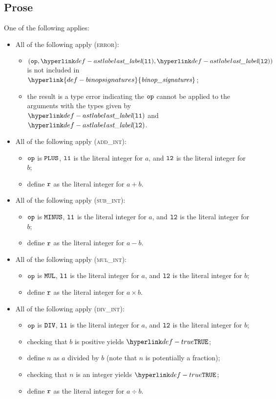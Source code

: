 \documentclass{book}
\newcommand\ProseOrTypeError[0]{\ProseTerminateAs{\TypeErrorConfig}}
\newcommand\binopsignatures[0]{\hyperlink{def-binopsignatures}{\textfunc{binop\_signatures}}}
\begin{document}
\subsection{Prose}
One of the following applies:
\begin{itemize}
  \item All of the following apply (\textsc{error}):
  \begin{itemize}
    \item $(\op, \astlabel(\vlone), \astlabel(\vltwo))$ is not included in $\binopsignatures$;
    \item the result is a type error indicating the $\texttt{op}$ cannot be applied to the arguments
          with the types given by $\astlabel(\vlone)$ and $\astlabel(\vltwo)$.
  \end{itemize}

  \item All of the following apply (\textsc{add\_int}):
  \begin{itemize}
    \item $\texttt{op}$ is $\texttt{PLUS}$, $\texttt{l1}$ is the literal integer for $a$, and $\texttt{l2}$ is the literal integer for $b$;
    \item define $\texttt{r}$ as the literal integer for $a+b$.
  \end{itemize}

  \item All of the following apply (\textsc{sub\_int}):
  \begin{itemize}
    \item $\texttt{op}$ is $\texttt{MINUS}$, $\texttt{l1}$ is the literal integer for $a$, and $\texttt{l2}$ is the literal integer for $b$;
    \item define $\texttt{r}$ as the literal integer for $a-b$.
  \end{itemize}

  \item All of the following apply (\textsc{mul\_int}):
  \begin{itemize}
    \item $\texttt{op}$ is $\texttt{MUL}$, $\texttt{l1}$ is the literal integer for $a$, and $\texttt{l2}$ is the literal integer for $b$;
    \item define $\texttt{r}$ as the literal integer for $a\times b$.
  \end{itemize}

  \item All of the following apply (\textsc{div\_int}):
  \begin{itemize}
    \item $\texttt{op}$ is $\texttt{DIV}$, $\texttt{l1}$ is the literal integer for $a$, and $\texttt{l2}$ is the literal integer for $b$;
    \item checking that $b$ is positive yields $\True$\ProseOrTypeError;
    \item define $n$ as $a$ divided by $b$ (note that $n$ is potentially a fraction);
    \item checking that $n$ is an integer yields $\True$\ProseOrTypeError;
    \item define $\texttt{r}$ as the literal integer for $a\div b$.
  \end{itemize}


\end{itemize}
\end{document}
